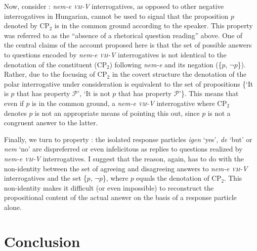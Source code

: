 \documentclass[output=paper,colorlinks,citecolor=brown]{langscibook}
\begin{document}
	
	Now, consider : \textit{nem-e \textsc{vm}-V} interrogatives, as opposed to other negative interrogatives in Hungarian, cannot be used to signal that the proposition $p$ denoted by   CP$_2$ is  in the common ground according to the speaker. This property  was referred to  as the ``absence of a rhetorical question reading'' above. One of the central claims  of the account proposed here is that  the set of possible answers to questions encoded by \textit{nem-e \textsc{vm}-V} interrogatives is not identical to the denotation of the constituent (CP$_2$) following \textit{nem-e}  and its negation (\{$p$, $\neg p$\}). Rather, due to the focusing of  CP$_2$ in the covert structure the denotation of the polar interrogative under consideration is equivalent to the set of propositions \{`{It is $p$ that has property $\mathcal{P}$}', `{It is not $p$ that has property $\mathcal{P}$}'\}. This means that even if  $p$ is in the common ground, a  \textit{nem-e \textsc{vm}-V} interrogative where  CP$_2$ denotes  $p$ is  not an appropriate means of pointing this out,  since $p$ is not a congruent answer to the latter.
	
	Finally, we turn to property : the isolated response particles \textit{igen} `yes', \textit{de} `but' or \textit{nem} `no' are dispreferred or even infelicitous as replies to questions realized by \textit{nem-e \textsc{vm}-V} interrogatives. I suggest that the reason, again,  has to do with  the non-identity between the set of agreeing and disagreeing answers to \textit{nem-e \textsc{vm}-V} interrogatives and the set \{$p$, $\neg p$\}, where $p$ equals the denotation of  CP$_2$. This  non-identity makes it difficult (or even impossible) to reconstruct the propositional content of the actual answer on the basis of a response particle alone.
	
	
	
\section{Conclusion}\label{sect:conclusion}
\end{document}
